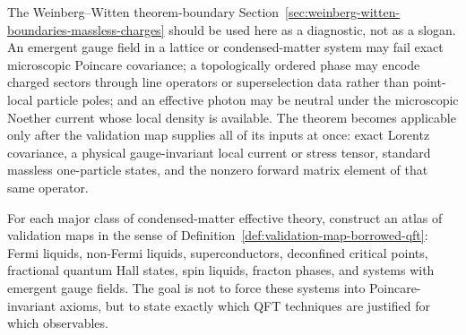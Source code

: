 The Weinberg--Witten theorem-boundary
Section~\ref{sec:weinberg-witten-boundaries-massless-charges} should be used
here as a diagnostic, not as a slogan.  An emergent gauge field in a lattice
or condensed-matter system may fail exact microscopic Poincare covariance; a
topologically ordered phase may encode charged sectors through line operators
or superselection data rather than point-local particle poles; and an
effective photon may be neutral under the microscopic Noether current whose
local density is available.  The theorem becomes applicable only after the
validation map supplies all of its inputs at once: exact Lorentz covariance,
a physical gauge-invariant local current or stress tensor, standard
massless one-particle states, and the nonzero forward matrix element of that
same operator.

\begin{openproblem}
\label{op:validated-condensed-matter-eft-atlas}
For each major class of condensed-matter effective theory, construct an
atlas of validation maps in the sense of
Definition~\ref{def:validation-map-borrowed-qft}: Fermi liquids, non-Fermi
liquids, superconductors, deconfined critical points, fractional quantum Hall
states, spin liquids, fracton phases, and systems with emergent gauge fields.
The goal is not to force these systems into Poincare-invariant axioms, but to
state exactly which QFT techniques are justified for which observables.
\end{openproblem}
